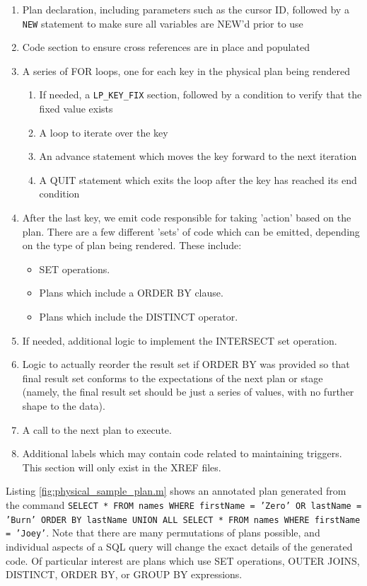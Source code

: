 \documentclass[]{article}
\def\code#1{\texttt{#1}}
\begin{document}
\begin{enumerate}
	\item Plan declaration, including parameters such as the cursor ID, followed by a \code{NEW} statement to make sure all variables are NEW'd prior to use
	\item Code section to ensure cross references are in place and populated
	\item A series of FOR loops, one for each key in the physical plan being rendered
	\begin{enumerate}
		\item If needed, a \code{LP\_KEY\_FIX} section, followed by a condition to verify that the fixed value exists
		\item A loop to iterate over the key
		\item An advance statement which moves the key forward to the next iteration
		\item A QUIT statement which exits the loop after the key has reached its end condition 
	\end{enumerate}
	\item After the last key, we emit code responsible for taking 'action' based on the plan. There are a few different 'sets' of code which can be emitted, depending on the type of plan being rendered. These include:
	\begin{itemize}
		\item SET operations.
		\item Plans which include a ORDER BY clause.
		\item Plans which include the DISTINCT operator.
	\end{itemize}
	\item If needed, additional logic to implement the INTERSECT set operation.
	\item Logic to actually reorder the result set if ORDER BY was provided so that final result set conforms to the expectations of the next plan or stage (namely, the final result set should be just a series of values, with no further shape to the data).
	\item A call to the next plan to execute.
	\item Additional labels which may contain code related to maintaining triggers. This section will only exist in the XREF files.
\end{enumerate}

Listing \ref{fig:physical_sample_plan.m} shows an annotated plan generated from the command \code{SELECT * FROM names WHERE firstName = 'Zero' OR lastName = 'Burn' ORDER BY lastName UNION ALL SELECT * FROM names WHERE firstName = 'Joey'}.
Note that there are many permutations of plans possible, and individual aspects of a SQL query will change the exact details of the generated code.
Of particular interest are plans which use SET operations, OUTER JOINS, DISTINCT, ORDER BY, or GROUP BY expressions.
\end{document}
